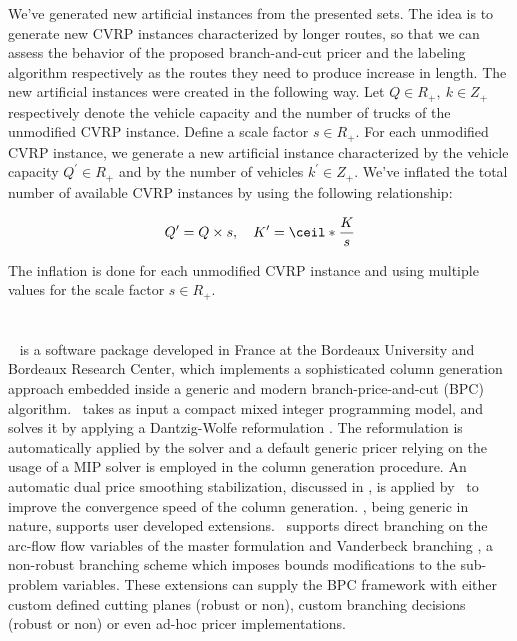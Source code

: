 \medskip

We've generated new artificial instances from the presented sets.
The idea is to generate new CVRP instances characterized by longer routes,
so that we can assess the behavior of the proposed branch-and-cut pricer
and the labeling algorithm respectively as the routes
they need to produce increase in length.
The new artificial instances were created in the following way.
Let $Q \in R_+,\ k \in Z_+$ respectively denote the vehicle
capacity and the number of trucks of the unmodified CVRP instance.
Define a scale factor $s \in R_+$.
For each unmodified CVRP instance, we generate a new artificial instance
characterized by the vehicle capacity $Q^\prime \in R_+$
and by the number of vehicles $k^\prime \in Z_+$.
We've inflated the total number of available CVRP instances
by using the following relationship:

$$
	Q^\prime = Q \times s, \quad K^\prime = \ceil*{\frac{K}{s}}
$$

The inflation is done for each unmodified CVRP instance and using
multiple values for the scale factor $s \in R_+$.

\section{\bapcod}
\label{sec:results-bapcod}

\textit{\bapcod}\ \parencite{sadykov2021} is a software package
developed in France at the Bordeaux University and Bordeaux Research Center,
which implements a sophisticated column generation approach
embedded inside a generic and modern branch-price-and-cut (BPC) algorithm.
\bapcod\ takes as input a compact mixed integer programming model,
and solves it by applying a Dantzig-Wolfe reformulation \parencite{dantzig1960}.
The reformulation is automatically applied by the solver
and a default generic pricer relying on
the usage of a MIP solver is employed in the column generation procedure.
An automatic dual price smoothing stabilization, discussed in \textcite{pessoa2018automation},
is applied by \bapcod\ to improve the convergence speed of the column generation.
\bapcod, being generic in nature,
supports user developed extensions.
\bapcod\ supports direct branching on the arc-flow flow variables of the master formulation
and Vanderbeck branching \parencite{vanderbeck2011}, a non-robust branching
scheme which imposes bounds modifications to the sub-problem variables.
These extensions can supply the BPC framework with either
custom defined cutting planes (robust or non), custom branching decisions (robust or non)
or even ad-hoc pricer implementations.

